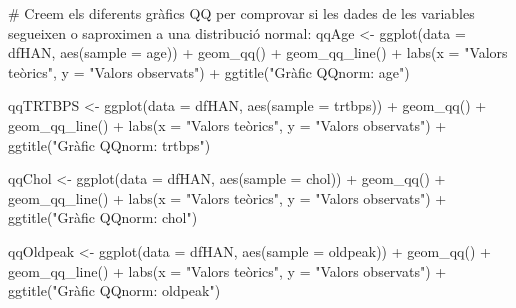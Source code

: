 \documentclass[
]{article}
\newenvironment{Shaded}{\begin{snugshade}}{\end{snugshade}}
\newcommand{\AttributeTok}[1]{\textcolor[rgb]{0.80,0.80,0.80}{#1}}
\newcommand{\CommentTok}[1]{\textcolor[rgb]{0.50,0.62,0.50}{#1}}
\newcommand{\FunctionTok}[1]{\textcolor[rgb]{0.94,0.94,0.56}{#1}}
\newcommand{\NormalTok}[1]{\textcolor[rgb]{0.80,0.80,0.80}{#1}}
\newcommand{\OtherTok}[1]{\textcolor[rgb]{0.94,0.94,0.56}{#1}}
\newcommand{\SpecialCharTok}[1]{\textcolor[rgb]{0.86,0.64,0.64}{#1}}
\newcommand{\StringTok}[1]{\textcolor[rgb]{0.80,0.58,0.58}{#1}}
\begin{document}
\begin{Shaded}
\begin{Highlighting}[]
\CommentTok{\# Creem els diferents gràfics QQ per comprovar si les dades de les variables segueixen o s\textquotesingle{}aproximen a una distribució normal:}
\NormalTok{qqAge }\OtherTok{\textless{}{-}} \FunctionTok{ggplot}\NormalTok{(}\AttributeTok{data =}\NormalTok{ dfHAN, }\FunctionTok{aes}\NormalTok{(}\AttributeTok{sample =}\NormalTok{ age)) }\SpecialCharTok{+}
  \FunctionTok{geom\_qq}\NormalTok{() }\SpecialCharTok{+}
  \FunctionTok{geom\_qq\_line}\NormalTok{() }\SpecialCharTok{+}
  \FunctionTok{labs}\NormalTok{(}\AttributeTok{x =} \StringTok{"Valors teòrics"}\NormalTok{, }\AttributeTok{y =} \StringTok{"Valors observats"}\NormalTok{) }\SpecialCharTok{+}
  \FunctionTok{ggtitle}\NormalTok{(}\StringTok{"Gràfic QQnorm: \textquotesingle{}age\textquotesingle{}"}\NormalTok{)}

\NormalTok{qqTRTBPS }\OtherTok{\textless{}{-}} \FunctionTok{ggplot}\NormalTok{(}\AttributeTok{data =}\NormalTok{ dfHAN, }\FunctionTok{aes}\NormalTok{(}\AttributeTok{sample =}\NormalTok{ trtbps)) }\SpecialCharTok{+}
  \FunctionTok{geom\_qq}\NormalTok{() }\SpecialCharTok{+}
  \FunctionTok{geom\_qq\_line}\NormalTok{() }\SpecialCharTok{+}
  \FunctionTok{labs}\NormalTok{(}\AttributeTok{x =} \StringTok{"Valors teòrics"}\NormalTok{, }\AttributeTok{y =} \StringTok{"Valors observats"}\NormalTok{) }\SpecialCharTok{+}
  \FunctionTok{ggtitle}\NormalTok{(}\StringTok{"Gràfic QQnorm: \textquotesingle{}trtbps\textquotesingle{}"}\NormalTok{)}

\NormalTok{qqChol }\OtherTok{\textless{}{-}} \FunctionTok{ggplot}\NormalTok{(}\AttributeTok{data =}\NormalTok{ dfHAN, }\FunctionTok{aes}\NormalTok{(}\AttributeTok{sample =}\NormalTok{ chol)) }\SpecialCharTok{+}
  \FunctionTok{geom\_qq}\NormalTok{() }\SpecialCharTok{+}
  \FunctionTok{geom\_qq\_line}\NormalTok{() }\SpecialCharTok{+}
  \FunctionTok{labs}\NormalTok{(}\AttributeTok{x =} \StringTok{"Valors teòrics"}\NormalTok{, }\AttributeTok{y =} \StringTok{"Valors observats"}\NormalTok{) }\SpecialCharTok{+}
  \FunctionTok{ggtitle}\NormalTok{(}\StringTok{"Gràfic QQnorm: \textquotesingle{}chol\textquotesingle{}"}\NormalTok{)}

\NormalTok{qqOldpeak }\OtherTok{\textless{}{-}} \FunctionTok{ggplot}\NormalTok{(}\AttributeTok{data =}\NormalTok{ dfHAN, }\FunctionTok{aes}\NormalTok{(}\AttributeTok{sample =}\NormalTok{ oldpeak)) }\SpecialCharTok{+}
  \FunctionTok{geom\_qq}\NormalTok{() }\SpecialCharTok{+}
  \FunctionTok{geom\_qq\_line}\NormalTok{() }\SpecialCharTok{+}
  \FunctionTok{labs}\NormalTok{(}\AttributeTok{x =} \StringTok{"Valors teòrics"}\NormalTok{, }\AttributeTok{y =} \StringTok{"Valors observats"}\NormalTok{) }\SpecialCharTok{+}
  \FunctionTok{ggtitle}\NormalTok{(}\StringTok{"Gràfic QQnorm: \textquotesingle{}oldpeak\textquotesingle{}"}\NormalTok{)}


\end{Highlighting}
\end{Shaded}
\end{document}
